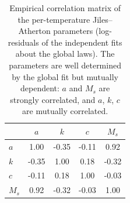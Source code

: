 \begin{table}[htbp]
  \centering
  \caption{Empirical correlation matrix of the per-temperature Jiles--Atherton parameters (log-residuals of the independent fits about the global laws). The parameters are well determined by the global fit but mutually dependent: $a$ and $M_s$ are strongly correlated, and $a$, $k$, $c$ are mutually correlated.}
  \label{tab:correlations}
  \begin{tabular}{lcccc}
    \toprule
     & $a$ & $k$ & $c$ & $M_s$ \\
    \midrule
    $a$ & 1.00 & -0.35 & -0.11 & 0.92 \\
    $k$ & -0.35 & 1.00 & 0.18 & -0.32 \\
    $c$ & -0.11 & 0.18 & 1.00 & -0.03 \\
    $M_s$ & 0.92 & -0.32 & -0.03 & 1.00 \\
    \bottomrule
  \end{tabular}
\end{table}
